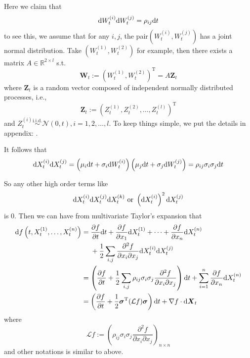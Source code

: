 \documentclass{homework}
\newcommand{\trans}{\mathrm T}
\begin{document}
\begin{subproblem}[(\alph*)]
        \item
        Here we claim that
        \[\mathrm d W_t^{(i)}\mathrm d W_t^{(j)}=\rho_{ij}\mathrm d t\]
        to see this,
        we assume that for any $i,j$, the pair$(W_t^{(i)},W_t^{(j)})$
        has a joint normal distribution. Take $(W_t^{(1)},W_t^{(2)})$ for example,
        then there exists a matrix $A\in\mathbb R^{2\times l}$ s.t.
        \[\boldsymbol W_t:=(W_t^{(1)},W_t^{(2)})^\trans
        =A\boldsymbol Z_t\]
        where $\boldsymbol Z_t$ is a random vector composed of independent normally
        distributed processes, i.e.,
        \[\boldsymbol Z_t:=(Z_t^{(1)},Z_t^{(2)},\ldots,Z_t^{(l)})^\trans\]
        and $Z_t^{(i)}\overset{\text{i.i.d.}}\sim\mathcal N(0,t),i=1,2,\ldots,l$.
        To keep things simple, we put the details in appendix: .

        It follows that
        \[\mathrm d X_t^{(i)}\mathrm d X_t^{(j)}
        =\left(\mu_i\mathrm d t+\sigma_i\mathrm d W_t^{(i)}\right)
        \left(\mu_j\mathrm d t+\sigma_j\mathrm d W_t^{(j)}\right)
        =\rho_{ij}\sigma_i\sigma_j\mathrm d t\]

        So any other high order terms like
        \[\mathrm d X_t^{(i)}\mathrm d X_t^{(j)}\mathrm d X_t^{(k)}\text{ or }
        \left(\mathrm d X_t^{(i)}\right)^2\mathrm d X_t^{(j)}\]
        is 0. Then we can have from multivariate Taylor's expansion
        that
        \[\begin{aligned}
            \diff f\left(t,X_t^{(1)},\ldots,X_t^{(n)}\right)&=
            \begin{aligned}[t]
            &\frac{\partial f}{\partial t}\diff t
            +\frac{\partial f}{\partial x_1}\diff X_t^{(1)}
            +\cdots
            +\frac{\partial f}{\partial x_n}\diff X_t^{(n)}\\
            &+\frac{1}{2}\sum_{i,j}\frac{\partial^2 f}{\partial x_i\partial x_j}
            \diff X_t^{(i)}\diff X_t^{(j)}\\
            \end{aligned}\\
            &=\left(\frac{\partial f}{\partial t}
            +\frac{1}{2}\sum_{i,j}\rho_{ij}\sigma_i\sigma_j
            \frac{\partial^2 f}{\partial x_i\partial x_j}
            \right)\diff t
            +\sum_{i=1}^n\frac{\partial f}{\partial x_n}\diff X_t^{(n)}\\
            &=\left(\frac{\partial f}{\partial t}
            +\frac{1}{2}\boldsymbol\sigma^\trans(\mathcal Lf)\boldsymbol\sigma\right)
            \diff t
            +\nabla f\cdot\diff\boldsymbol X_t
        \end{aligned}\]
        where
        \[\mathcal Lf:=\left(\rho_{ij}\sigma_i\sigma_j
            \frac{\partial^2 f}{\partial x_i\partial x_j}\right)_{n\times n}\]
        and other notations is similar to above.

    \end{subproblem}
\end{document}
